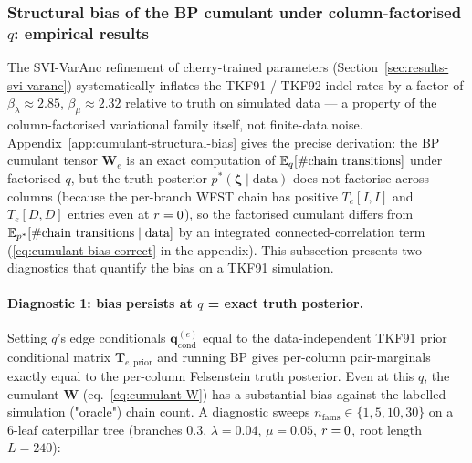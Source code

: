 
\subsubsection{Structural bias of the BP cumulant under
column-factorised \texorpdfstring{$q$}{q}: empirical results}
\label{sec:cumulant-structural-bias-results}

The SVI-VarAnc refinement of cherry-trained parameters
(Section~\ref{sec:results-svi-varanc}) systematically inflates the
TKF91 / TKF92 indel rates by a factor of $\beta_\lambda \approx
2.85$, $\beta_\mu \approx 2.32$ relative to truth on simulated
data --- a property of the column-factorised variational family
itself, not finite-data noise.  Appendix~\ref{app:cumulant-structural-bias}
gives the precise derivation: the BP cumulant tensor
$\mathbf{W}_e$ is an exact computation of $\mathbb{E}_q[\#\text{chain
transitions}]$ under factorised $q$, but the truth posterior
$p^*(\boldsymbol{\zeta} \mid \text{data})$ does not factorise across
columns (because the per-branch WFST chain has positive
$T_e[I, I]$ and $T_e[D, D]$ entries even at $r = 0$), so the
factorised cumulant differs from $\mathbb{E}_{p^*}[\#\text{chain
transitions} \mid \text{data}]$ by an integrated connected-correlation
term (\eqref{eq:cumulant-bias-correct} in the appendix).  This
subsection presents two diagnostics that quantify the bias on a
TKF91 simulation.

\paragraph{Diagnostic 1: bias persists at $q$ = exact truth posterior.}
Setting $q$'s edge conditionals $\mathbf{q}_{\text{cond}}^{(e)}$ equal
to the data-independent TKF91 prior conditional matrix
$\mathbf{T}_{e,\text{prior}}$ and running BP gives per-column
pair-marginals exactly equal to the per-column Felsenstein truth
posterior.  Even at this $q$, the cumulant
$\mathbf{W}$ (eq.~\ref{eq:cumulant-W}) has a substantial bias against the
labelled-simulation ("oracle") chain count.  A diagnostic
sweeps $n_{\text{fams}}
\in \{1, 5, 10, 30\}$ on a 6-leaf caterpillar tree (branches
$0.3$, $\lambda = 0.04$, $\mu = 0.05$, $r = 0$, root
length $L = 240$):

